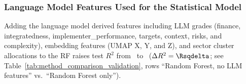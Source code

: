 \subsubsection{Language Model Features Used for the Statistical Model}
Adding the language model derived features including LLM grades (finance, integratedness, implementer\_performance, targets, context, risks, and complexity), embedding features (UMAP X, Y, and Z), and sector cluster allocations to the RF raises test $R^2$ from \Rsqnollmfrac\ to \Rsqheldoutratingsllmfeatures\ ($\Delta R^2 = \Rsqdelta$; see Table~\ref{tab:method_comparison_validation}, rows ``Random Forest, no LLM features'' vs.\ ``Random Forest only'').                                       
                                                                             





